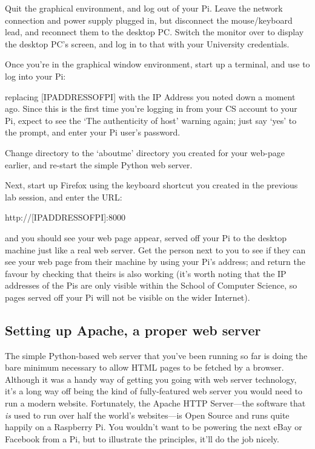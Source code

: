 Quit the graphical environment, and log out of your Pi. Leave the network connection and power supply plugged in, but disconnect the mouse/keyboard lead, and reconnect them to the desktop PC. Switch the monitor over to display the desktop PC's screen, and log in to that with your University credentials. 

Once you're in the graphical window environment, start up a terminal, and use  to log into your Pi:


replacing [IPADDRESSOFPI] with the IP Address you noted down a moment ago. Since this is the first time you're logging in from your CS account to your Pi, expect to see the `The authenticity of host' warning again; just say `yes' to the prompt, and enter your Pi user's password. 

Change directory to the `aboutme' directory you created for your web-page earlier, and re-start the simple Python web server. 

Next, start up Firefox using the keyboard shortcut you created in the previous lab session, and enter the URL:

\begin{ttoutenv}
http://[IPADDRESSOFPI]:8000
\end{ttoutenv}

and you should see your web page appear, served off your Pi to the desktop machine just like a real web server. Get the person next to you to see if they can see your web page from their machine by using your Pi's address; and return the favour by checking that theirs is also working (it's worth noting that the IP addresses of the Pis are only visible within the School of Computer Science, so pages served off your Pi will not be visible on the wider Internet).


\subsection{Setting up Apache, a proper web server}

The simple Python-based web server that you've been running so far is doing the bare minimum necessary to allow HTML pages to be fetched by a browser. Although it was a handy way of getting you going with web server technology, it's a long way off being the kind of fully-featured web server you would need to run a modern website. Fortunately, the Apache HTTP Server---the software that \textit{is} used to run over half the world's websites---is Open Source and runs quite happily on a Raspberry Pi. You wouldn't want to be powering the next eBay or Facebook from a Pi, but to illustrate the principles, it'll do the job nicely. 

